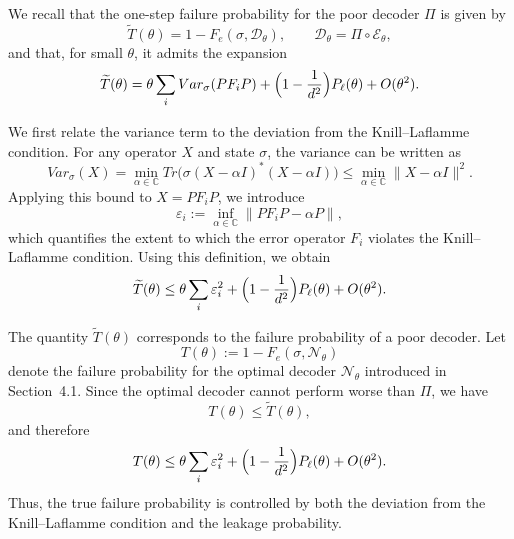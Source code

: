 \documentclass[12pt]{article}
\theoremstyle{definition} %
\theoremstyle{plain} %
\theoremstyle{remark} %
\theoremstyle{underline}
\begin{document}


We recall that the one-step failure probability for the poor decoder $\Pi$ is given by
\[
    \widetilde T(\theta)=1-F_e(\sigma,\mathcal D_\theta),
    \qquad
    \mathcal D_\theta=\Pi\circ\mathcal E_\theta,
\]
and that, for small $\theta$, it admits the expansion
\[
    \widetilde T(\theta)
    =
    \theta\sum_i Var_\sigma(PF_iP)
    +
    \Bigl(1-\frac{1}{d^2}\Bigr)P_\ell(\theta)
    +
    O(\theta^2).
\]

We first relate the variance term to the deviation from the Knill--Laflamme condition.
For any operator $X$ and state $\sigma$, the variance can be written as
\[
    Var_\sigma(X)
    =
    \min_{\alpha\in\mathbb{C}}
    Tr\!\bigl(\sigma (X-\alpha I)^*(X-\alpha I)\bigr)
    \le
    \min_{\alpha\in\mathbb{C}}\|X-\alpha I\|^2.
\]
Applying this bound to $X=PF_iP$, we introduce
\[
    \varepsilon_i
    :=
    \inf_{\alpha\in\mathbb{C}}\|PF_iP-\alpha P\|,
\]
which quantifies the extent to which the error operator $F_i$ violates the Knill--Laflamme condition.
Using this definition, we obtain
\[
    \widetilde T(\theta)
    \le
    \theta\sum_i \varepsilon_i^2
    +
    \Bigl(1-\frac{1}{d^2}\Bigr)P_\ell(\theta)
    +
    O(\theta^2).
\]

The quantity $\widetilde T(\theta)$ corresponds to the failure probability of a poor decoder.
Let
\[
    T(\theta):=1-F_e(\sigma,\mathcal N_\theta)
\]
denote the failure probability for the optimal decoder $\mathcal N_\theta$ introduced in Section~4.1. Since the optimal decoder cannot perform worse than $\Pi$, we have
\[
    T(\theta)\le \widetilde T(\theta),
\]
and therefore
\[
    T(\theta)
    \le
    \theta\sum_i \varepsilon_i^2
    +
    \Bigl(1-\frac{1}{d^2}\Bigr)P_\ell(\theta)
    +
    O(\theta^2).
\]
Thus, the true failure probability is controlled by both the deviation from the Knill--Laflamme condition and the leakage probability.
\end{document}

